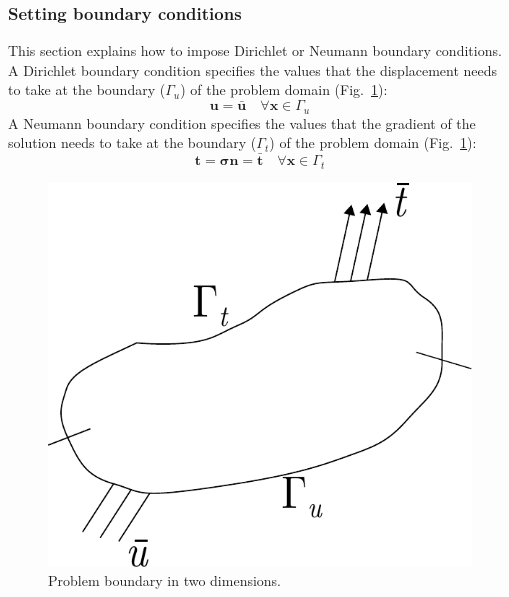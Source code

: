 \documentclass[a4paper,11pt]{book}
\renewcommand{\vec}[1]{\ensuremath{\boldsymbol{#1}}}
\newcommand{\mat}[1]{\ensuremath{\boldsymbol{#1}}}
\begin{document}
\subsubsection{Setting boundary conditions\label{sect:smm:boundary}}
This section explains how to impose Dirichlet or Neumann boundary conditions. A Dirichlet boundary condition specifies the values that the displacement needs to take at the boundary ($\Gamma_u$) of the problem domain (Fig.~\ref{fig:smm:boundaries}):
\begin{equation}
  \vec{u} = \vec{\bar u} \quad \forall \vec{x}\in \Gamma_{u}
\end{equation}
A Neumann boundary condition specifies the values that the gradient of the solution needs to take at the boundary ($\Gamma_t$) of the problem domain (Fig.~\ref{fig:smm:boundaries}):
\begin{equation}
  \vec{t} = \mat{\sigma} \vec{n} = \vec{\bar t} \quad \forall \vec{x}\in \Gamma_{t}
\end{equation} 
\begin{figure}[!htb]
  \centering
  \includegraphics[scale=0.6]{figures/boundary}
  \caption{Problem boundary in two dimensions.\label{fig:smm:boundaries}}
\end{figure}
\end{document}
